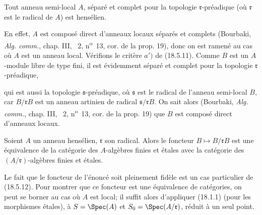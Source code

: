\begin{proposition}[18.5.14]
\label{IV.18.5.14}
Tout anneau semi-local $A$, séparé et complet pour la topologie $\mathfrak r$-préadique (où $\mathfrak r$ est le radical de $A$) est hensélien.
\end{proposition}

En effet, $A$ est composé direct d'anneaux locaux séparés et complets (Bourbaki, \emph{Alg. comm.}, chap. III, \textsection~2, n\textsuperscript{o}~13, cor. de la prop. 19), donc on est ramené au cas où $A$ est un anneau local. Vérifions le critère $a')$ de (18.5.11). Comme $B$ est un $A$-module libre de type fini, il est évidemment séparé et complet pour la topologie $\mathfrak r$-préadique,


qui est aussi la topologie $\mathfrak s$-préadique, où $\mathfrak s$ est le radical de l'anneau semi-local $B$, car $B/\mathfrak rB$ est un anneau artinien de radical $\mathfrak s/\mathfrak rB$. On sait alors (Bourbaki, \emph{Alg. comm.}, chap. III, \textsection~2, n\textsuperscript{o}~13, cor. de la prop. 19) que $B$ est composé direct d'anneaux locaux.

\begin{proposition}[18.5.15]
\label{IV.18.5.15}
Soient $A$ un anneau hensélien, $\mathfrak r$ son radical. Alors le foncteur $B\longmapsto B/\mathfrak rB$ est une équivalence de la catégorie des $A$-algèbres finies et étales avec la catégorie des $(A/\mathfrak r)$-algèbres finies et étales.
\end{proposition}

Le fait que le foncteur de l'énoncé soit pleinement fidèle est un cas particulier de (18.5.12). Pour montrer que ce foncteur est une équivalence de catégories, on peut se borner au cas où $A$ est local; il suffit alors d'appliquer (18.1.1) (pour les morphismes étales), à $S=\Spec(A)$ et $S_0=\Spec(A/\mathfrak r)$, réduit à un seul point.

